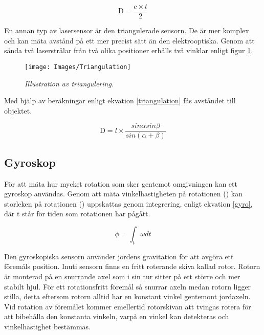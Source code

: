 \documentclass[11pt]{article}
\begin{document}
\begin{flushleft}
\begin{equation}\label{laser_eq}
\textrm{D} = \frac {c \times t}{2} 
\end{equation}

En annan typ av lasersensor är den triangulerade sensorn. De är mer komplex och kan mäta avstånd på ett mer precist sätt än den elektrooptiska. Genom att sända två laserstrålar från två olika positioner erhålls två vinklar enligt figur \ref{Triangulation}. 

\begin{figure}[htbp]
	\centering
	\texttt{[image: Images/Triangulation]}
	\caption{\textit{Illustration av triangulering.} \label{Triangulation}}
\end{figure}

Med hjälp av beräkningar enligt ekvation \ref{triangulation} fås avståndet till objektet. \cite{website:triangulation} \cite{website:mti}

\begin{equation}\label{triangulation}
\textrm{D} = l\times\frac {sin\alpha sin\beta}{sin(\alpha + \beta)} 
\end{equation}




\subsection{Gyroskop}
För att mäta hur mycket rotation som sker gentemot omgivningen kan ett gyroskop användas. Genom att mäta vinkelhastigheten på rotationen (\textomega) kan storleken på rotationen (\straightphi) uppskattas genom integrering, enligt ekvation \ref{gyro}, där t står för tiden som rotationen har pågått. \cite{Gyroscope}

\begin{equation}\label{gyro}
	\phi = \int_{t}^{ }\omega dt 						
\end{equation}

Den gyroskopiska sensorn använder jordens gravitation för att avgöra ett föremåls position. Inuti sensorn finns en fritt roterande skiva kallad rotor. Rotorn är monterad på en snurrande axel som i sin tur sitter på ett större och mer stabilt hjul. För ett rotationsfritt föremål så snurrar axeln medan rotorn ligger stilla, detta eftersom rotorn alltid har en konstant vinkel gentemont jordaxeln. Vid rotation av föremålet kommer emellertid rotorskivan att tvingas rotera för att bibehålla den konstanta vinkeln, varpå en vinkel kan detekteras och vinkelhastighet bestämmas. \cite{Gyro}


\end{flushleft}
\end{document}
